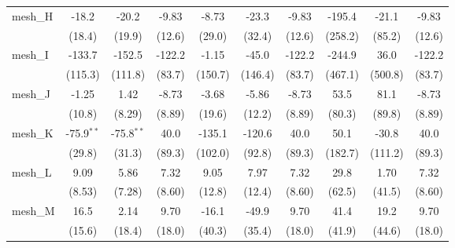 \begin{tabular}{lccccccccc}
   mesh\_H                                                     & -18.2        & -20.2         & -9.83         & -8.73       & -23.3        & -9.83         & -195.4    & -21.1   & -9.83\\   
                                                               & (18.4)       & (19.9)        & (12.6)        & (29.0)      & (32.4)       & (12.6)        & (258.2)   & (85.2)  & (12.6)\\   
   mesh\_I                                                     & -133.7       & -152.5        & -122.2        & -1.15       & -45.0        & -122.2        & -244.9    & 36.0    & -122.2\\   
                                                               & (115.3)      & (111.8)       & (83.7)        & (150.7)     & (146.4)      & (83.7)        & (467.1)   & (500.8) & (83.7)\\   
   mesh\_J                                                     & -1.25        & 1.42          & -8.73         & -3.68       & -5.86        & -8.73         & 53.5      & 81.1    & -8.73\\   
                                                               & (10.8)       & (8.29)        & (8.89)        & (19.6)      & (12.2)       & (8.89)        & (80.3)    & (89.8)  & (8.89)\\   
   mesh\_K                                                     & -75.9$^{**}$ & -75.8$^{**}$  & 40.0          & -135.1      & -120.6       & 40.0          & 50.1      & -30.8   & 40.0\\   
                                                               & (29.8)       & (31.3)        & (89.3)        & (102.0)     & (92.8)       & (89.3)        & (182.7)   & (111.2) & (89.3)\\   
   mesh\_L                                                     & 9.09         & 5.86          & 7.32          & 9.05        & 7.97         & 7.32          & 29.8      & 1.70    & 7.32\\   
                                                               & (8.53)       & (7.28)        & (8.60)        & (12.8)      & (12.4)       & (8.60)        & (62.5)    & (41.5)  & (8.60)\\   
   mesh\_M                                                     & 16.5         & 2.14          & 9.70          & -16.1       & -49.9        & 9.70          & 41.4      & 19.2    & 9.70\\   
                                                               & (15.6)       & (18.4)        & (18.0)        & (40.3)      & (35.4)       & (18.0)        & (41.9)    & (44.6)  & (18.0)\\   

\end{tabular}
